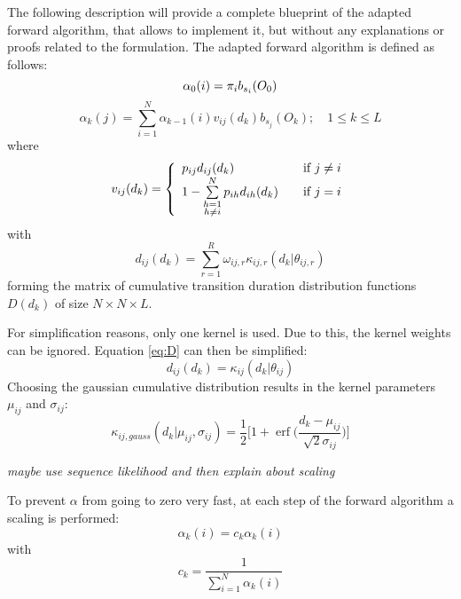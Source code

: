 \documentclass[mscthesis]{usiinfthesis}
\DeclareMathOperator{\erf}{erf}
\begin{document}
The following description will provide a complete blueprint of the adapted
forward algorithm, that allows to implement it, but without any explanations or
proofs related to the formulation. The adapted forward algorithm is defined as
follows:
\begin{equation}
    \label{eq:forward_init}
    \alpha_0(i) = \pi_{i}b_{s_i}(O_0) \\
\end{equation}
\begin{equation}
    \label{eq:forward}
    \alpha_k(j) = \sum_{i=1}^{N} \alpha_{k-1}(i) v_{ij}(d_k) b_{s_j}(O_k);
    \quad 1 \leq k \leq L
\end{equation}
where
\begin{equation}
    \label{eq:V}
    v_{ij}(d_k) = \left\{
        \begin{array}{l l}
            p_{ij} d_{ij}(d_k)
                & \quad \text{if $j \neq i$}\\
            1 - \sum\limits_{\substack{h=1 \\ h \neq i}}^{N} p_{ih} d_{ih}(d_k)
                & \quad \text{if $j = i$}
        \end{array} \right.
\end{equation}
with
\begin{equation}
    \label{eq:D}
    d_{ij}(d_k) = \sum_{r=1}^{R} \omega_{ij,r}\kappa_{ij,r}(d_k|\theta_{ij, r})
\end{equation}
forming the matrix of cumulative transition duration distribution functions
$ D(d_k) $ of size $ N \times N \times L $.

For simplification reasons, only one kernel is used. Due to this, the kernel
weights can be ignored. Equation \ref{eq:D} can then be simplified:
\begin{equation}
    \label{eq:D_fact}
    d_{ij}(d_k) = \kappa_{ij}(d_k | \theta_{ij})
\end{equation}
Choosing the gaussian cumulative distribution results in the kernel parameters
$ \mu_{ij} $ and $ \sigma_{ij} $:
\begin{equation}
    \label{eq:kernel}
    \kappa_{ij, gauss}(d_k | \mu_{ij}, \sigma_{ij}) = 
    \frac{1}{2}\bigg [1 + \erf \big (\frac{d_k - \mu_{ij}}{\sqrt 2 \sigma_{ij}}\big )
        \bigg ]
\end{equation}

\emph{\color{red}maybe use sequence likelihood and then explain about scaling}

To prevent $ \alpha $ from going to zero very fast, at each step of the forward
algorithm a scaling is performed:
\begin{equation}
    \alpha_k(i) = c_k \alpha_k(i)
\end{equation}
with
\begin{equation}
    c_k = \frac{1}{\sum\limits_{i=1}^{N} \alpha_k(i)}
\end{equation}
\end{document}
